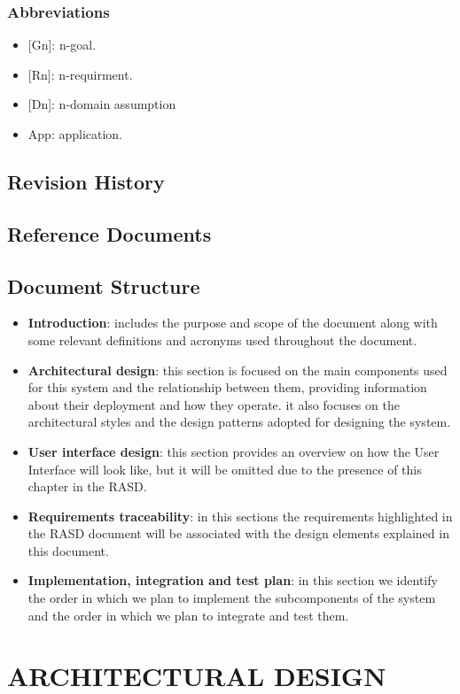 \documentclass[12pt,a4paper]{article}
\begin{document}
\subsubsection{Abbreviations}
\begin{itemize}
	\item {[Gn]}: n-goal.
	\item {[Rn]}: n-requirment.
	\item {[Dn]}: n-domain assumption
	\item {App}: application.
\end{itemize}
\subsection{Revision History}
\subsection{Reference Documents}
\subsection{Document Structure}
\begin{itemize}
\item \textbf{Introduction}: includes the purpose and scope of the document along with some relevant definitions and acronyms used throughout the document.
\item \textbf{Architectural design}: this section is focused on the main components used for this system and the relationship between them, providing information about their
deployment and how they operate. it also focuses on the architectural styles and the design patterns adopted for designing the system.
\item \textbf{User interface design}: this section provides an overview on how the User Interface will look like, but it will be omitted due to the presence of this chapter in the RASD.
\item \textbf{Requirements traceability}: in this sections the requirements highlighted in the RASD document will be associated with the design elements explained in this document.
\item \textbf{Implementation, integration and test plan}: in this section we identify the order in which we plan to implement the subcomponents of the system and the order in which we plan to
integrate and test them.
\end{itemize}
\newpage
\section{ARCHITECTURAL DESIGN}
\end{document}
